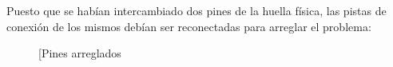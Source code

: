 \begin{itemize}
    Puesto que se habían intercambiado dos pines de la huella física, las pistas de conexión de los mismos debían ser reconectadas para arreglar el problema:
    
    \begin{figure}[H]
    \centering
    \subfigure[Pines arreglados

\end{figure}
\end{itemize}
